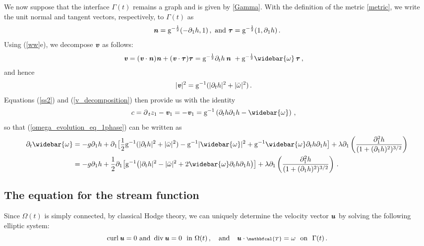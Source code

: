 \documentclass[11pt]{article}
\theoremstyle{plain}
\theoremstyle{definition}
\theoremstyle{definition}
\def\bfn{{\mathbf n}}
\def\rg{{\rm g}}
\def\bfn{\text{\bf\emph{n}}}
\def\p{\text{\bf\emph{p}}}
\def\u{\text{\bf\emph{u}}}
\def\v{\text{\bf\emph{v}}}
\def\bp{{\partial_1}}
\def\p{{\partial\hspace{1pt}}}
\def\smallexp#1{{\text{\small #1}}}
\def\dfrac#1#2{\smallexp{$\displaystyle{}\frac{#1}{#2}$}}
\def\tt{{\scriptstyle \mathbfcal{T} }}
\begin{document}
We now suppose that the interface $\Gamma(t)$  remains a graph and is given by \eqref{Gamma}.
With the definition of the metric \eqref{metric}, we write the unit normal and tangent vectors, respectively, to $\Gamma(t)$ as
$$\bfn = \rg^{-\frac{1}{2}} (-\p_{\!1} h,1) \,, \text{ and } \boldsymbol{\tau} = \rg^{-\frac{1}{2}} (1, \p_{\!1} h) \,.$$
Using (\ref{ww}e), we decompose $\v$ as follows:
\begin{align}
\v&= (\v \cdot \bfn) \bfn + (\v\cdot {\boldsymbol\tau}) {\boldsymbol\tau}
 = \rg^{-\frac{1}{2}}  \partial_t h \, \bfn \ + \rg^{-\frac{1}{2}} \widebar{\omega} \, {\boldsymbol\tau} \,, \label{v_decomposition}
\end{align}
and hence
\begin{align}
|\v|^2 &= \rg ^{-1} (|\partial_t h|^2  + |\bar \omega|^2)  \,. \label{v-squared}
\end{align}
Equations (\ref{ss2}) and (\ref{v_decomposition}) then provide us with the identity
\begin{align*}
c &= \p_t z_1 - \v_1 = - \v_1
= \rg^{-1}\left( \partial_t h \p_{\!1} h -  \widebar{\omega}\right)\,,
\end{align*}
so that (\ref{omega_evolution_eq_1phase}) can be written as
\begin{align}
\partial_t \widebar{\omega} &= - g \p_{\!1} h + \p_{\!1} \big[\dfrac{1}{2} \rg ^{-1} (|\partial_t h|^2  + |\bar \omega|^2) - \rg^{-1} |\widebar{\omega}|^2 + \rg^{-1} \widebar{\omega} \partial_t h \p_{\!1} h \big]+\lambda \partial_1\left(\frac{\partial_1^2h}{(1+(\bp h)^2)^{3/2}}\right) \nonumber\\
&= - g \p_{\!1} h + \frac{1}{2} \p_{\!1} \big[\rg ^{-1} \big(|\partial_t h|^2  - |\bar \omega|^2 + 2 \widebar{\omega} \partial_t h \p_{\!1} h\big) \big]+\lambda \partial_1\left(\frac{\partial_1^2h}{(1+(\bp h)^2)^{3/2}}\right)\label{omega_evolution_eq_1phase_h}\,.
\end{align}



\subsection{The equation for the stream function}
Since $\Omega(t)$ is simply connected, by classical Hodge theory, we can uniquely determine the velocity vector $\u$ by solving the following elliptic system:
\begin{equation} \label{onephaseelliptic}
\operatorname{curl}  \u = 0  \text{ and }
\operatorname{div} \u  = 0 \ \text{ in }\Omega(t)\,, \ \ \text{ and } \ \
\u \cdot \tt = \omega \ \text{ on }\ \Gamma(t)\,.
\end{equation}
\end{document}
